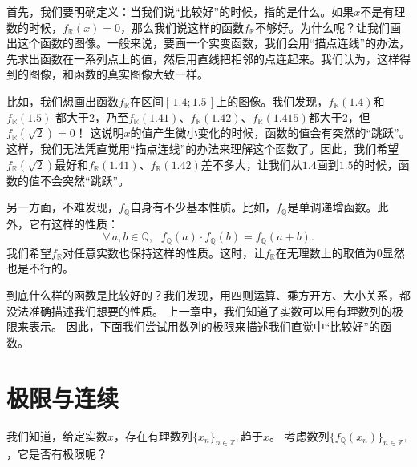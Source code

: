 \documentclass[12pt,UTF8,fontset=none]{ctexbook}
\begin{document}
首先，我们要明确定义：当我们说“比较好”的时候，指的是什么。如果$x$不是有理数的时候，$f_{\mathbb{R}}(x) = 0$，那么我们说这样的函数$f_{\mathbb{R}}$不够好。为什么呢？让我们画出这个函数的图像。一般来说，要画一个实变函数，我们会用“描点连线”的办法，先求出函数在一系列点上的值，然后用直线把相邻的点连起来。我们认为，这样得到的图像，和函数的真实图像大致一样。

比如，我们想画出函数$f_{\mathbb{R}}$在区间$[\,1.4;1.5\,]$上的图像。我们发现，$f_{\mathbb{R}}(1.4)$和$f_{\mathbb{R}}(1.5)$
都大于2，乃至$f_{\mathbb{R}}(1.41)$、$f_{\mathbb{R}}(1.42)$、$f_{\mathbb{R}}(1.415)$都大于$2$，但$f_{\mathbb{R}}(\sqrt{2}) = 0$！
这说明$x$的值产生微小变化的时候，函数的值会有突然的“跳跃”。这样，我们无法凭直觉用“描点连线”的办法来理解这个函数了。因此，我们希望
$f_{\mathbb{R}}(\sqrt{2})$最好和$f_{\mathbb{R}}(1.41)$、$f_{\mathbb{R}}(1.42)$差不多大，让我们从$1.4$画到$1.5$的时候，函数的值不会突然“跳跃”。

另一方面，不难发现，$f_{\mathbb{Q}}$自身有不少基本性质。比如，$f_{\mathbb{Q}}$是单调递增函数。此外，它有这样的性质：
$$\forall \, a, b\in \mathbb{Q}, \;\,\, f_{\mathbb{Q}}(a) \cdot f_{\mathbb{Q}}(b) = f_{\mathbb{Q}}(a + b).$$
我们希望$f_{\mathbb{R}}$对任意实数也保持这样的性质。这时，让$f_{\mathbb{R}}$在无理数上的取值为$0$显然也是不行的。

到底什么样的函数是比较好的？我们发现，用四则运算、乘方开方、大小关系，都没法准确描述我们想要的性质。
上一章中，我们知道了实数可以用有理数列的极限来表示。
因此，下面我们尝试用数列的极限来描述我们直觉中“比较好”的函数。

\section{极限与连续}
我们知道，给定实数$x$，存在有理数列$\{x_n\}_{n\in\mathbb{Z}^+}$趋于$x$。
考虑数列$\{f_{\mathbb{Q}}(x_n)\}_{n\in\mathbb{Z}^+}$，它是否有极限呢？
\end{document}
